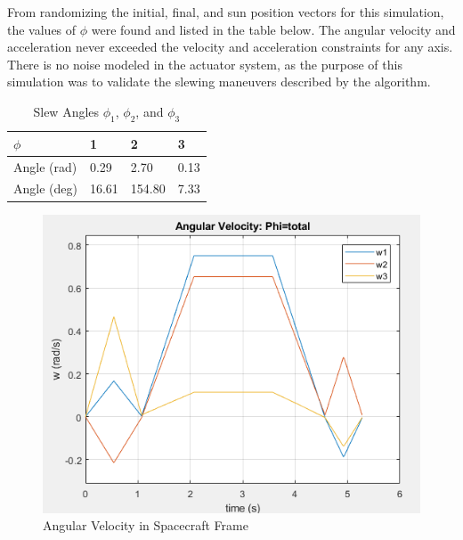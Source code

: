 \documentclass[letterpaper, preprint, paper,11pt]{AAS}	%
\begin{document}
		From randomizing the initial, final, and sun position vectors for this simulation, the values of $\phi$ were found and listed in the table below. The angular velocity and acceleration never exceeded the velocity and acceleration constraints for any axis. There is no noise modeled in the actuator system, as the purpose of this simulation was to validate the slewing maneuvers described by the algorithm. 
		
				\begin{table}[H]
					\centering
					\caption{Slew Angles $\phi_1$, $\phi_2$, and $\phi_3$}
					\begin{tabular}{llll}
						\toprule
						\midrule
						$\phi$ & 1 & 2 & 3 \\
						\midrule
						Angle (rad) & 0.29 & 2.70 & 0.13 \\
						Angle (deg) & 16.61 & 154.80 & 7.33 \\ 
						\midrule
						\bottomrule
					\end{tabular}%
					\label{tab:FOG_SF}%
				\end{table}%
		

			\begin{figure}[H]
				\label{fig:ang_vel_phi_total}
				\begin{center}
				\includegraphics[width=4.5in]{figures/ang_vel_phi_total.png}
				\end{center}
				\caption{Angular Velocity in Spacecraft Frame}
			\end{figure}
		
\end{document}
